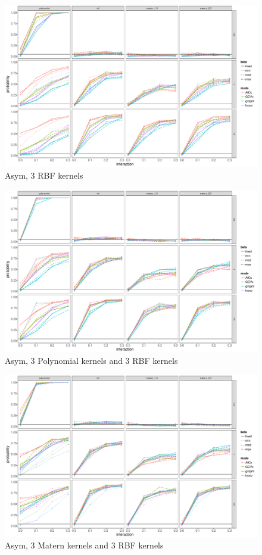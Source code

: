 \documentclass[article]{jss}
\begin{document}
\begin{appendix}
\begin{figure}
\begin{center}
\includegraphics[width=0.9\columnwidth]{exp_A3} 
\caption{Asym, 3 RBF kernels}
\label{fig:res}
\end{center}
\end{figure}

\begin{figure}
\begin{center}
\includegraphics[width=0.9\columnwidth]{exp_A4} 
\caption{Asym, 3 Polynomial kernels and 3 RBF kernels}
\label{fig:res}
\end{center}
\end{figure}

\begin{figure}
\begin{center}
\includegraphics[width=0.9\columnwidth]{exp_A5} 
\caption{Asym, 3 Matern kernels and 3 RBF kernels}
\label{fig:res}
\end{center}
\end{figure}


\end{appendix}
\end{document}

